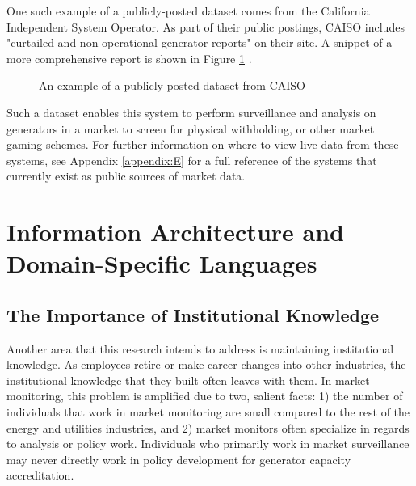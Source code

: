 One such example of a publicly-posted dataset comes from the California Independent System Operator. As part of their public postings, CAISO includes "curtailed and non-operational generator reports" on their site. A snippet of a more comprehensive report is shown in Figure \ref{fig:caiso-outage-example} \cite{caiso-public-data-example}.

\begin{figure}[ht]
\centering
{}
\caption{An example of a publicly-posted dataset from CAISO}
\label{fig:caiso-outage-example}
\end{figure}

Such a dataset enables this system to perform surveillance and analysis on generators in a market to screen for physical withholding, or other market gaming schemes. For further information on where to view live data from these systems, see Appendix \ref{appendix:E} for a full reference of the systems that currently exist as public sources of market data. 

\section{Information Architecture and Domain-Specific Languages}

\subsection{The Importance of Institutional Knowledge}

Another area that this research intends to address is maintaining institutional knowledge. As employees retire or make career changes into other industries, the institutional knowledge that they built often leaves with them. In market monitoring, this problem is amplified due to two, salient facts: 1) the number of individuals that work in market monitoring are small compared to the rest of the energy and utilities industries, and 2) market monitors often specialize in regards to analysis or policy work. Individuals who primarily work in market surveillance may never directly work in policy development for generator capacity accreditation.

